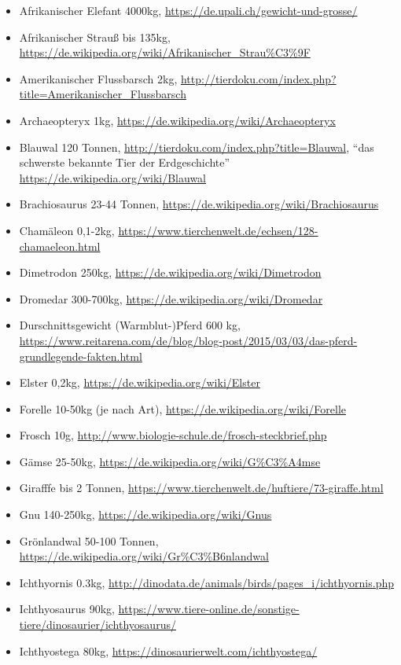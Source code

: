  \begin{itemize}
  \item Afrikanischer Elefant 4000kg, \url{https://de.upali.ch/gewicht-und-grosse/}
  \item Afrikanischer Strauß bis 135kg, \url{https://de.wikipedia.org/wiki/Afrikanischer_Strau\%C3\%9F}
  \item Amerikanischer Flussbarsch 2kg, \url{http://tierdoku.com/index.php?title=Amerikanischer_Flussbarsch}
  \item Archaeopteryx 1kg, \url{https://de.wikipedia.org/wiki/Archaeopteryx}
  \item Blauwal 120 Tonnen, \url{http://tierdoku.com/index.php?title=Blauwal}, "`das schwerste bekannte Tier der Erdgeschichte"' \url{https://de.wikipedia.org/wiki/Blauwal}
  \item Brachiosaurus 23-44 Tonnen, \url{https://de.wikipedia.org/wiki/Brachiosaurus}
  \item Chamäleon 0,1-2kg, \url{https://www.tierchenwelt.de/echsen/128-chamaeleon.html}
  \item Dimetrodon 250kg, \url{https://de.wikipedia.org/wiki/Dimetrodon}
  \item Dromedar 300-700kg, \url{https://de.wikipedia.org/wiki/Dromedar}
  \item Durschnittsgewicht (Warmblut-)Pferd 600 kg, \url{https://www.reitarena.com/de/blog/blog-post/2015/03/03/das-pferd-grundlegende-fakten.html}
  \item Elster 0,2kg, \url{https://de.wikipedia.org/wiki/Elster}
  \item Forelle 10-50kg (je nach Art), \url{https://de.wikipedia.org/wiki/Forelle}
  \item Frosch 10g, \url{http://www.biologie-schule.de/frosch-steckbrief.php}
  \item Gämse 25-50kg, \url{https://de.wikipedia.org/wiki/G\%C3\%A4mse}
  \item Girafffe bis 2 Tonnen, \url{https://www.tierchenwelt.de/huftiere/73-giraffe.html}
  \item Gnu 140-250kg, \url{https://de.wikipedia.org/wiki/Gnus}
  \item Grönlandwal 50-100 Tonnen, \url{https://de.wikipedia.org/wiki/Gr\%C3\%B6nlandwal}
  \item Ichthyornis 0.3kg, \url{http://dinodata.de/animals/birds/pages_i/ichthyornis.php}
  \item Ichthyosaurus 90kg, \url{https://www.tiere-online.de/sonstige-tiere/dinosaurier/ichthyosaurus/}
  \item Ichthyostega 80kg, \url{https://dinosaurierwelt.com/ichthyostega/}

\end{itemize}
